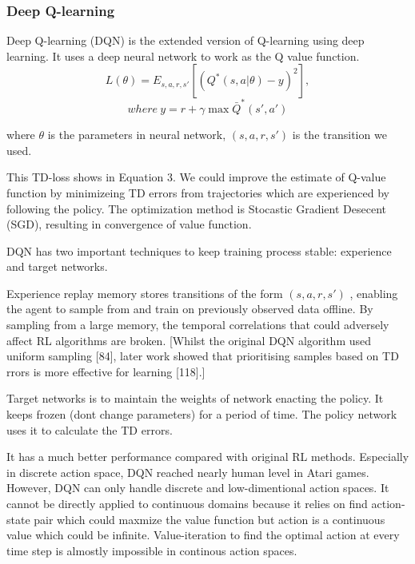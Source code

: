 \documentclass[11pt,twocolumn]{jarticle} %
\begin{document}
\subsubsection{Deep Q-learning}

Deep Q-learning (DQN) \cite{dqn}  is the extended version of Q-learning using deep learning. It uses a deep neural network to work as the Q value function. 
\begin{equation}
L(\theta) = E_{s,a,r,s'}[(Q^*(s, a|\theta) - y)^2],  
\end{equation}
$$where\ y = r + \gamma\max \bar{Q}^*(s', a')$$

where $\theta$ is the parameters in neural network, $(s,a,r,s')$ is the transition we used. \par

This TD-loss shows in Equation 3. We could improve the estimate of Q-value function by minimizeing TD errors from trajectories which are experienced by following the policy. The optimization method is Stocastic Gradient Desecent (SGD), resulting in convergence of value function. \par
DQN has two important techniques to keep training process stable: experience and target networks.\par
Experience replay \cite{replay} memory stores transitions of the form $(s,a,r,s')$ , enabling the agent to sample from and train on previously observed data offline. By sampling from a large memory, the temporal correlations that could adversely affect RL algorithms are broken. [Whilst the original DQN algorithm used uniform sampling [84], later work showed that prioritising samples based on TD  rrors is more effective for learning [118].] \par
Target networks \cite{qlearning} is to maintain the weights of network enacting the policy. It keeps frozen (dont change parameters) for a period of time. The policy network uses it to calculate the TD errors. \par

It has a much better performance compared with original RL methods. Especially in discrete action space, DQN reached nearly human level in Atari games. However, DQN can only handle discrete and low-dimentional action spaces. It cannot be directly applied to continuous domains because it relies on find action-state pair which could maxmize the value function but action is a continuous value which could be infinite. Value-iteration to find the optimal action at every time step is almostly impossible in continous action spaces. 
\end{document}
